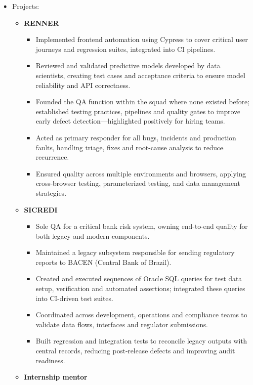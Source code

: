 {\begin{itemize}
    \item Projects:
    \begin{itemize}
        \item \textbf{RENNER}
        \begin{itemize}
            \item Implemented frontend automation using Cypress to cover critical user journeys and regression suites, integrated into CI pipelines.
            \item Reviewed and validated predictive models developed by data scientists, creating test cases and acceptance criteria to ensure model reliability and API correctness.
            \item Founded the QA function within the squad where none existed before; established testing practices, pipelines and quality gates to improve early defect detection—highlighted positively for hiring teams.
            \item Acted as primary responder for all bugs, incidents and production faults, handling triage, fixes and root-cause analysis to reduce recurrence.
            \item Ensured quality across multiple environments and browsers, applying cross-browser testing, parameterized testing, and data management strategies.
        \end{itemize}
        \item \textbf{SICREDI}
        \begin{itemize}
            \item Sole QA for a critical bank risk system, owning end-to-end quality for both legacy and modern components.
            \item Maintained a legacy subsystem responsible for sending regulatory reports to BACEN (Central Bank of Brazil).
            \item Created and executed sequences of Oracle SQL queries for test data setup, verification and automated assertions; integrated these queries into CI-driven test suites.
            \item Coordinated across development, operations and compliance teams to validate data flows, interfaces and regulator submissions.
            \item Built regression and integration tests to reconcile legacy outputs with central records, reducing post-release defects and improving audit readiness.
        \end{itemize}
        \item \textbf{Internship mentor}

\end{itemize}
\end{itemize}}
